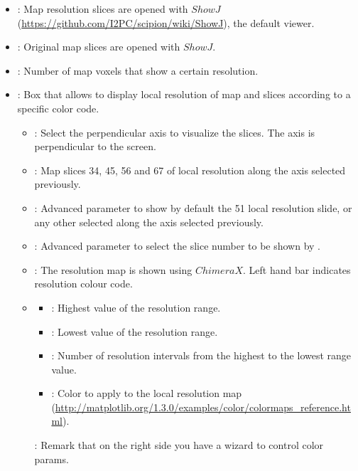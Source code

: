 \begin{itemize}
   \begin{itemize}
     \item {}: Map resolution slices are opened with $ShowJ$ (\url{https://github.com/I2PC/scipion/wiki/ShowJ}), the default \scipion viewer.
     \item {}: Original map slices are opened with $ShowJ$.
     \item {}: Number of map voxels that show a certain resolution.
     \item {}: Box that allows to display local resolution of map and slices according to a specific color code.
     \begin{itemize}
        \item {}: Select the perpendicular axis to visualize the slices. The  axis is perpendicular to the screen.
        \item {}: Map slices 34, 45, 56 and 67 of local resolution along the axis selected previously.
        \item {}: Advanced parameter to show by default the 51 local resolution slide, or any other selected along the axis selected previously.
        \item {}:  Advanced parameter to select the slice number to be shown by .
        \item {}: The resolution map is shown using $ChimeraX$. Left hand bar indicates resolution colour code.
        \item
        \begin{itemize}
            \item {}: Highest value of the resolution range.
            \item {}: Lowest value of the resolution range.
            \item {}: Number of resolution intervals from the highest to the lowest range value.
            \item {}: Color to apply to the local resolution map (\url{http://matplotlib.org/1.3.0/examples/color/colormaps_reference.html}).
        \end{itemize}  
        : Remark that on the right side you have a wizard to control color params.
     \end{itemize}
   \end{itemize} 



\end{itemize}
